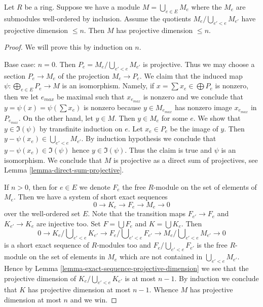 \begin{lemma}
\label{lemma-colimit-projective-dimension}
Let $R$ be a ring. Suppose we have a module $M = \bigcup_{e \in E} M_e$
where the $M_e$ are submodules well-ordered by inclusion. Assume the quotients
$M_e/\bigcup\nolimits_{e' < e} M_{e'}$ have projective dimension $\leq n$.
Then $M$ has projective dimension $\leq n$.
\end{lemma}

\begin{proof}
We will prove this by induction on $n$.

\medskip\noindent
Base case: $n = 0$. Then $P_e = M_e/\bigcup_{e' < e} M_{e'}$ is projective.
Thus we may choose a section $P_e \to M_e$ of the projection $M_e \to P_e$.
We claim that the induced map $\psi : \bigoplus_{e \in E} P_e \to M$ is an
isomorphism. Namely, if $x = \sum x_e \in \bigoplus P_e$ is nonzero,
then we let $e_{max}$ be maximal such that $x_{e_{max}}$ is nonzero
and we conclude that $y = \psi(x) = \psi(\sum x_e)$ is nonzero because
$y \in M_{e_{max}}$ has nonzero image $x_{e_{max}}$ in $P_{e_{max}}$.
On the other hand, let $y \in M$. Then $y \in M_e$ for some $e$.
We show that $y \in \Im(\psi)$ by transfinite induction on $e$.
Let $x_e \in P_e$ be the image of $y$. Then
$y - \psi(x_e) \in \bigcup_{e' < e} M_{e'}$.
By induction hypothesis we conclude that $y - \psi(x_e) \in \Im(\psi)$
hence $y \in \Im(\psi)$. Thus the claim is true and
$\psi$ is an isomorphism. We conclude that $M$ is projective as
a direct sum of projectives, see
Lemma \ref{lemma-direct-sum-projective}.

\medskip\noindent
If $n > 0$, then for $e \in E$ we denote $F_e$ the free $R$-module
on the set of elements of $M_e$. Then we have a system of
short exact sequences
$$
0 \to K_e \to F_e \to M_e \to 0
$$
over the well-ordered set $E$. Note that the transition maps
$F_{e'} \to F_e$ and $K_{e'} \to K_e$ are injective too.
Set $F = \bigcup F_e$ and $K = \bigcup K_e$. Then
$$
0 \to
K_e/\bigcup\nolimits_{e' < e} K_{e'} \to
F_e/\bigcup\nolimits_{e' < e} F_{e'} \to
M_e/\bigcup\nolimits_{e' < e} M_{e'} \to 0
$$
is a short exact sequence of $R$-modules too and
$F_e/\bigcup_{e' < e} F_{e'}$ is the free $R$-module on the
set of elements in $M_e$ which are not contained in $\bigcup_{e' < e} M_{e'}$.
Hence by
Lemma \ref{lemma-exact-sequence-projective-dimension}
we see that the projective dimension of $K_e/\bigcup_{e' < e} K_{e'}$
is at most $n - 1$. By induction we conclude that $K$ has projective
dimension at most $n - 1$. Whence $M$ has projective dimension at most
$n$ and we win.
\end{proof}